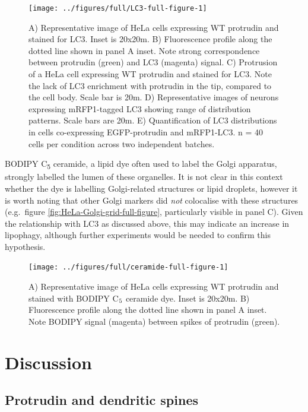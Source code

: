 \documentclass[
  12pt,
  a4paper,
]{book}
\begin{document}
\begin{figure}
\texttt{[image: ../figures/full/LC3-full-figure-1]} \caption[Protrudin effect on LC3 localisation in HeLa cells and cortical neurons]{A) Representative image of HeLa cells expressing WT protrudin and stained for LC3.  Inset is 20x20\textmu{}m.  B) Fluorescence profile along the dotted line shown in panel A inset.  Note strong correspondence between protrudin (green) and LC3 (magenta) signal.  C) Protrusion of a HeLa cell expressing WT protrudin and stained for LC3.  Note the lack of LC3 enrichment with protrudin in the tip, compared to the cell body.  Scale bar is 20\textmu{}m.  D) Representative images of neurons expressing mRFP1-tagged LC3 showing range of distribution patterns.  Scale bars are 20\textmu{}m.  E) Quantification of LC3 distributions in cells co-expressing EGFP-protrudin and mRFP1-LC3.  n = 40 cells per condition across two independent batches.}\label{fig:LC3-full-figure}
\end{figure}

BODIPY C\textsubscript{5} ceramide, a lipid dye often used to label the Golgi apparatus, strongly labelled the lumen of these organelles. It is not clear in this context whether the dye is labelling Golgi-related structures or lipid droplets, however it is worth noting that other Golgi markers did \emph{not} colocalise with these structures (e.g.~figure \ref{fig:HeLa-Golgi-grid-full-figure}, particularly visible in panel C). Given the relationship with LC3 as discussed above, this may indicate an increase in lipophagy, although further experiments would be needed to confirm this hypothesis.

\begin{figure}
\texttt{[image: ../figures/full/ceramide-full-figure-1]} \caption[Protrudin effect on BODIPY C$\textsubscript{5}$ ceramide localisation in HeLa cells]{A) Representative image of HeLa cells expressing WT protrudin and stained with BODIPY C$\textsubscript{5}$ ceramide dye.  Inset is 20x20\textmu{}m.  B) Fluorescence profile along the dotted line shown in panel A inset.  Note BODIPY signal (magenta) between spikes of protrudin (green).}\label{fig:ceramide-full-figure}
\end{figure}

\hypertarget{discussion}{%
\section{Discussion}\label{discussion}}

\hypertarget{protrudin-and-dendritic-spines}{%
\subsection{Protrudin and dendritic spines}\label{protrudin-and-dendritic-spines}}
\end{document}
